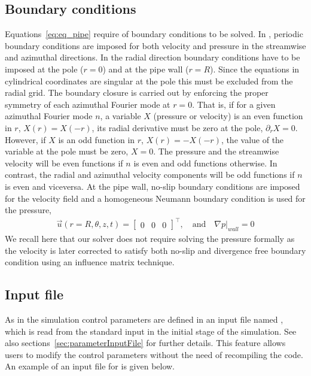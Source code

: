 \documentclass[a4paper, 11pt, DIV=11]{scrartcl}
\begin{document}
\subsection{Boundary conditions}
\label{subsec:bcpipe}

Equations~\eqref{eq:eq_pipe} require of boundary conditions to be solved. In \nsp,
periodic boundary conditions are imposed for both velocity and pressure in the streamwise
and azimuthal directions. In the radial direction boundary conditions have to be imposed
at the pole ($r=0$) and at the pipe wall ($r=R$). Since the equations in cylindrical
coordinates are singular at the pole this must be excluded from the radial grid.
The boundary closure is carried out by enforcing the proper symmetry of each azimuthal
Fourier mode at $r=0$. That is, if for a given azimuthal Fourier mode $n$,
a variable $X$ (pressure or velocity) is an even function in $r$, $X(r) = X(-r)$,
its radial derivative must be zero at the pole, $\partial_r X = 0$. However, if $X$ is
an odd function in $r$, $X(r) = -X(-r)$, the value of the variable at the pole must be zero,
$X = 0$. The pressure and the streamwise velocity will be even functions if
$n$ is even and odd functions otherwise. In contrast, the radial and azimuthal velocity
components will be odd functions if $n$ is even and viceversa. At the pipe wall,
no-slip boundary conditions are imposed for the velocity field and a homogeneous
Neumann boundary condition is used for the pressure,
\begin{align}
  \vec{u}(r=R, \theta, z, t) =
  \begin{bmatrix}
    0 & 0 & 0
  \end{bmatrix}^{\intercal},
  \hspace{1em}\text{and}\hspace{1em}
  \nabla p|_{wall} = 0
  \label{eq:pipe_wallBC}
\end{align}
We recall here that our solver does not require solving the pressure formally
as the velocity is later corrected to satisfy both no-slip and divergence free
boundary condition using an influence matrix technique.

\subsection{Input file}
\label{subsec:input_nspipe}

As in \nsc the simulation control parameters are defined in an input file named
, which is read from the standard input in the initial stage of
the simulation. See also sections~\ref{sec:parameterInputFile} for further details.
This feature allows
users to modify the control parameters without the need of
recompiling the code. An example of an input file for \nsp is
given below.
\end{document}
